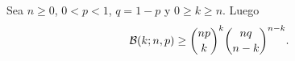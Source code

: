 \begin{statement}{18}
  Sea $n \geq 0$, $0 < p < 1$, $q = 1 - p$ y $0 \geq k \geq n$. Luego
  \[
    \mathcal{B}(k; n, p) \geq \binom{np}{k}^k \binom{nq}{n - k}^{n - k}.
  \]
\end{statement}
